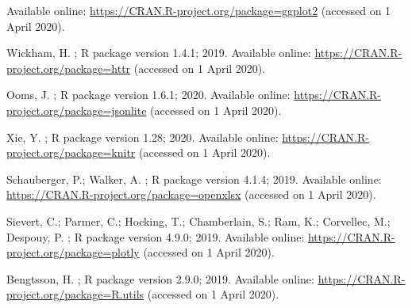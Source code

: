 \documentclass[data,datadescriptor,accept,moreauthors,pdftex]{Definitions/mdpi}
\begin{document}
\begin{thebibliography}{999}
\newblock Available online: \url{https://CRAN.R-project.org/package=ggplot2}
\newblock (accessed on 1 April 2020).

Wickham, H.
;
\newblock R package version 1.4.1;  2019.
\newblock Available online: \url{https://CRAN.R-project.org/package=httr}
\newblock (accessed on 1 April 2020).

Ooms, J.
;
\newblock R package version 1.6.1;  2020.
\newblock Available online: \url{https://CRAN.R-project.org/package=jsonlite}
\newblock (accessed on 1 April 2020).

Xie, Y.
;
\newblock R package version 1.28;  2020.
\newblock Available online: \url{https://CRAN.R-project.org/package=knitr}
\newblock (accessed on 1 April 2020).

Schauberger, P.; Walker, A.
;
\newblock R package version 4.1.4;  2019.
\newblock Available online: \url{https://CRAN.R-project.org/package=openxlsx}
\newblock (accessed on 1 April 2020).

Sievert, C.; Parmer, C.; Hocking, T.; Chamberlain, S.; Ram, K.; Corvellec, M.;
  Despouy, P.
;
\newblock R package version 4.9.0;  2019.
\newblock Available online: \url{https://CRAN.R-project.org/package=plotly}
\newblock (accessed on 1 April 2020).

Bengtsson, H.
;
\newblock R package version 2.9.0;  2019.
\newblock Available online: \url{https://CRAN.R-project.org/package=R.utils}
\newblock (accessed on 1 April 2020).


\end{thebibliography}
\end{document}
